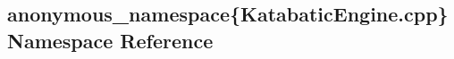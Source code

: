 \hypertarget{namespaceanonymous__namespace_02KatabaticEngine_8cpp_03}{\subsection{anonymous\-\_\-namespace\{Katabatic\-Engine.\-cpp\} Namespace Reference}
\label{namespaceanonymous__namespace_02KatabaticEngine_8cpp_03}
}
